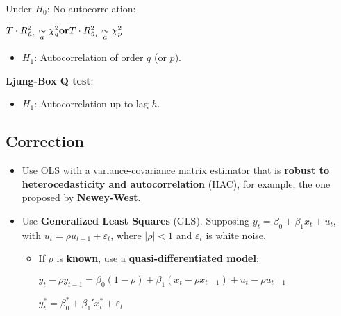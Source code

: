 \documentclass[10pt, a4paper, landscape]{article}
\begin{document}
\begin{multicols}{3}
\begin{itemize}[leftmargin=*]
			Under $H_{0}$: No autocorrelation:
			
			\begin{center}
				$\hfill T \cdot R^{2}_{\hat{u}_t}\underset{a}{\sim}\chi^{2}_{q} \hfill \textbf{or} \hfill T \cdot R^{2}_{\hat{u}_t}\underset{a}{\sim}\chi^{2}_{p} \hfill$
			\end{center}
			
			\begin{itemize}[leftmargin=*]
				\item $H_{1}$: Autocorrelation of order $q$ (or $p$).
			\end{itemize}
			
			\textbf{Ljung-Box Q test}:
			
			\begin{itemize}[leftmargin=*]
				\item $H_{1}$: Autocorrelation up to lag $h$.
			\end{itemize}
			
		\end{itemize}
		
		\columnbreak
		
		\subsection*{Correction}
		
		\begin{itemize}[leftmargin=*]
			\item Use OLS with a variance-covariance matrix estimator that is \textbf{robust to heterocedasticity and autocorrelation} (HAC), for example, the one proposed by \textbf{Newey-West}.
			\item Use \textbf{Generalized Least Squares} (GLS). Supposing $y_{t} = \beta_{0} + \beta_{1} x_{t} + u_{t}$, with $u_{t} = \rho u_{t - 1}+ \varepsilon_{t}$, where $\lvert \rho \rvert < 1$ and $\varepsilon_{t}$ is \underline{white noise}.
			
			\begin{itemize}[leftmargin=*]
				\item If $\rho$ is \textbf{known}, use a \textbf{quasi-differentiated model}:
			
				\begin{center}
					$y_{t} - \rho y_{t - 1}= \beta_{0} (1 - \rho) + \beta_{1} (x_{t} - \rho x_{t - 1}) + u_{t} - \rho u_{t - 1}$
					
					$y_{t}^{*} = \beta_{0}^{*} + \beta_{1}' x_{t}^{*} + \varepsilon_{t}$
				\end{center}
				

\end{itemize}
\end{itemize}
\end{multicols}
\end{document}
